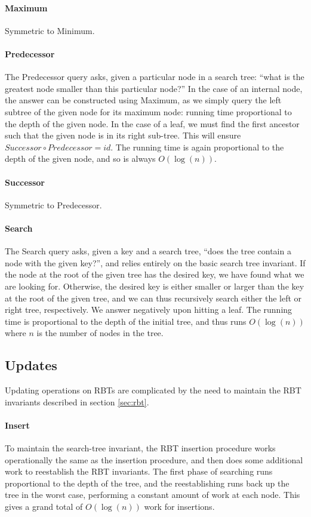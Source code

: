 \documentclass[oneside,11pt,openright]{report}
\begin{document}
\paragraph{Maximum} Symmetric to Minimum.

\paragraph{Predecessor} The Predecessor query asks, given a particular
node in a search tree: ``what is the greatest node smaller than this
particular node?'' In the case of an internal node, the answer can be
constructed using Maximum, as we simply query the left subtree of the
given node for its maximum node: running time proportional to the
depth of the given node. In the case of a leaf, we must find the first
ancestor such that the given node is in its right sub-tree. This will
ensure $Successor \circ Predecessor = id$. The running time is again
proportional to the depth of the given node, and so is always
$O(\log(n))$.

\paragraph{Successor} Symmetric to Predecessor.

\paragraph{Search} The Search query asks, given a key and a search
tree, ``does the tree contain a node with the given key?'', and relies
entirely on the basic search tree invariant. If the node at the root
of the given tree has the desired key, we have found what we are
looking for. Otherwise, the desired key is either smaller or larger
than the key at the root of the given tree, and we can thus
recursively search either the left or right tree, respectively. We
answer negatively upon hitting a leaf. The running time is
proportional to the depth of the initial tree, and thus runs
$O(\log(n))$ where $n$ is the number of nodes in the tree.

\subsection{Updates}

Updating operations on RBTs are complicated by the need to maintain
the RBT invariants described in section \ref{sec:rbt}.

\paragraph{Insert} To maintain the search-tree invariant, the
RBT insertion procedure works operationally the same as the insertion
procedure, and then does some additional work to reestablish the RBT
invariants. The first phase of searching runs proportional to the
depth of the tree, and the reestablishing runs back up the tree in the
worst case, performing a constant amount of work at each node. This
gives a grand total of $O(\log(n))$ work for insertions.
\end{document}
